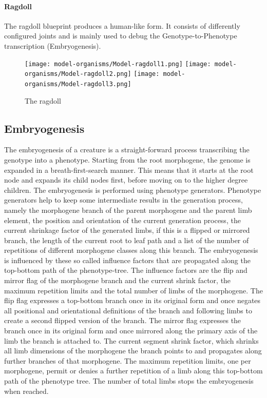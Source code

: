 \documentclass[main]{subfiles}
\begin{document}
\paragraph{Ragdoll}

The ragdoll blueprint produces a human-like form. %
%
It consists of differently configured joints and is mainly used to debug the Genotype-to-Phenotype transcription (Embryogenesis).

\begin{figure}[H]
\centering
\texttt{[image: model-organisms/Model-ragdoll1.png]}
\texttt{[image: model-organisms/Model-ragdoll2.png]}
\texttt{[image: model-organisms/Model-ragdoll3.png]}
\caption[The ragdoll]{The ragdoll}
\label{figure:ragdoll}
\end{figure}

\subsection{Embryogenesis}
\label{subsec:embryogenesis}

The embryogenesis of a creature is a straight-forward process transcribing the genotype into a phenotype. %
%
Starting from the root morphogene, the genome is expanded in a breath-first-search manner. %
%
This means that it starts at the root node and expands its child nodes first, before moving on to the higher degree children. %
%
The embryogenesis is performed using phenotype generators. %
%
Phenotype generators help to keep some intermediate results in the generation process, namely the morphogene branch of the parent morphogene and the parent limb element, the position and orientation of the current generation process, the current shrinkage factor of the generated limbs, if this is a flipped or mirrored branch, the length of the current root to leaf path and a list of the number of repetitions of different morphogene classes along this branch. %
%
The embryogenesis is influenced by these so called influence factors that are propagated along the top-bottom path of the phenotype-tree. %
%
The influence factors are the flip and mirror flag of the morphogene branch and the current shrink factor, the maximum repetition limits and the total number of limbs of the morphogene. %
%
The flip flag expresses a top-bottom branch once in its original form and once negates all positional and orientational definitions of the branch and following limbs to create a second flipped version of the branch. %
%
The mirror flag expresses the branch once in its original form and once mirrored along the primary axis of the limb the branch is attached to. %
%
The current segment shrink factor, which shrinks all limb dimensions of the morphogene the branch points to and propagates along further branches of that morphogene. %
%
The maximum repetition limits, one per morphogene, permit or denies a further repetition of a limb along this top-bottom path of the phenotype tree. %
%
The number of total limbs stops the embryogenesis when reached.
\end{document}
